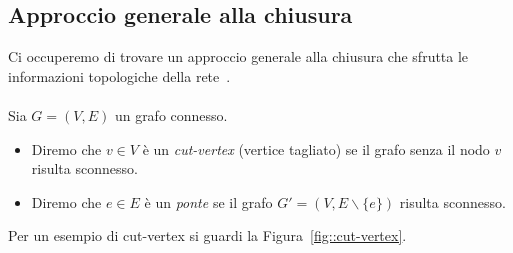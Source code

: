 \subsection{Approccio generale alla chiusura}
Ci occuperemo di trovare un approccio generale alla chiusura che sfrutta le informazioni topologiche della rete~\cite{KISS}.\\ \\
Sia $G=(V,E)$ un grafo connesso.
\begin{itemize}
\item Diremo che $v\in V$ \`e un \textit{cut-vertex} (vertice tagliato) se il grafo senza il nodo $v$ risulta sconnesso.
\item Diremo che $e\in E$ \`e un \textit{ponte} se il grafo $G'=(V, E\backslash\{e\})$ risulta sconnesso.
\end{itemize}
Per un esempio di cut-vertex si guardi la Figura~\ref{fig::cut-vertex}.
